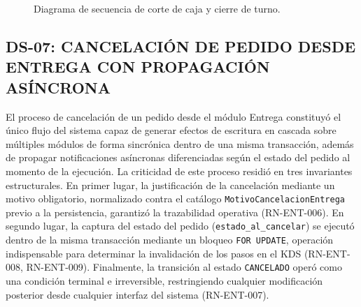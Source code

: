 \begin{landscape}
\begin{figure}[H]
    \centering
    
    \caption{Diagrama de secuencia de corte de caja y cierre de turno.}
    \label{fig:diagrama-secuencia-corte-caja}
\end{figure}
\end{landscape}

\subsection{DS-07: CANCELACIÓN DE PEDIDO DESDE ENTREGA CON PROPAGACIÓN ASÍNCRONA}
El proceso de cancelación de un pedido desde el módulo Entrega constituyó el único flujo del sistema capaz de generar efectos de escritura en cascada sobre múltiples módulos de forma sincrónica dentro de una misma transacción, además de propagar notificaciones asíncronas diferenciadas según el estado del pedido al momento de la ejecución. La criticidad de este proceso residió en tres invariantes estructurales. En primer lugar, la justificación de la cancelación mediante un motivo obligatorio, normalizado contra el catálogo \texttt{MotivoCancelacionEntrega} previo a la persistencia, garantizó la trazabilidad operativa (RN-ENT-006). En segundo lugar, la captura del estado del pedido (\texttt{estado\_al\_cancelar}) se ejecutó dentro de la misma transacción mediante un bloqueo \texttt{FOR UPDATE}, operación indispensable para determinar la invalidación de los pasos en el KDS (RN-ENT-008, RN-ENT-009). Finalmente, la transición al estado \texttt{CANCELADO} operó como una condición terminal e irreversible, restringiendo cualquier modificación posterior desde cualquier interfaz del sistema (RN-ENT-007). 

